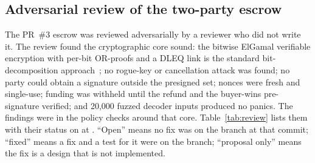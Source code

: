 \subsection{Adversarial review of the two-party escrow}
\label{sec:review}

The PR~\#3 escrow was reviewed adversarially by a reviewer who did not write it. The review found the cryptographic core sound: the bitwise ElGamal verifiable encryption with per-bit OR-proofs and a DLEQ link is the standard bit-decomposition approach~\citep{stadler1996pvss}; no rogue-key or cancellation attack was found; no party could obtain a signature outside the presigned set; nonces were fresh and single-use; funding was withheld until the refund and the buyer-wins pre-signature verified; and 20{,}000 fuzzed decoder inputs produced no panics. The findings were in the policy checks around that core. Table~\ref{tab:review} lists them with their status on  at \reviewcommit. ``Open'' means no fix was on the branch at that commit; ``fixed'' means a fix and a test for it were on the branch; ``proposal only'' means the fix is a design that is not implemented.

